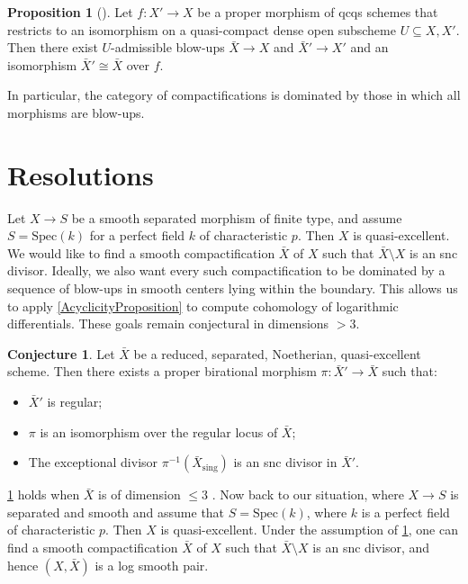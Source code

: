 \documentclass{amsart}
\def\Spec{\textrm{Spec}}
\theoremstyle{definition}
\newtheorem{proposition}[theorem]{Proposition}
\newtheorem{conjecture}[theorem]{Conjecture}
\numberwithin{equation}{section}
\begin{document}
\begin{proposition}[{\cite[Theorem 2.11]{Conrad}}]\label{BlowupsDomModif}
	Let $f: X' \to X$ be a proper morphism of qcqs schemes that restricts to an isomorphism on a quasi-compact dense open subscheme $U \subseteq X, X'$. Then there exist $U$-admissible blow-ups $\bar{X} \to X$ and $\bar{X}' \to X'$ and an isomorphism $\bar{X}' \cong \bar{X}$ over $f$.
\end{proposition}
In particular, the category of compactifications is dominated by those in which all morphisms are blow-ups.
\section{Resolutions}

Let $X \to S$ be a smooth separated morphism of finite type, and assume $S = \Spec(k)$ for a perfect field $k$ of characteristic $p$. Then $X$ is quasi-excellent. We would like to find a smooth compactification $\bar{X}$ of $X$ such that $\bar{X} \setminus X$ is an snc divisor. Ideally, we also want every such compactification to be dominated by a sequence of blow-ups in smooth centers lying within the boundary. This allows us to apply  \cref{AcyclicityProposition} to compute cohomology of logarithmic differentials. These goals remain conjectural in dimensions $>3$.

\begin{conjecture}\label{ConjResolution3}
	Let $\bar{X}$ be a reduced, separated, Noetherian, quasi-excellent scheme. Then there exists a proper birational morphism $\pi: \bar{X}' \to \bar{X}$ such that:
	\begin{itemize}
		\item $\bar{X}'$ is regular;
		\item $\pi$ is an isomorphism over the regular locus of $\bar{X}$;
		\item The exceptional divisor $\pi^{-1}(\bar{X}_{\mathrm{sing}})$ is an snc divisor in $\bar{X}'$.
	\end{itemize}
\end{conjecture}

\cref{ConjResolution3} holds when $\bar{X}$ is of dimension $\leq 3$ \cite{Resolution3}. Now back to our situation, where $X\to S$ is separated and smooth and assume that $S=\Spec(k)$, where $k$ is a perfect field of characteristic $p$. Then $X$ is quasi-excellent. Under the assumption of \cref{ConjResolution3}, one can find a smooth compactification $\bar{X}$ of $X$ such that $\bar{X} \setminus X$ is an snc divisor, and hence $(X, \bar{X})$ is a log smooth pair.
\end{document}
